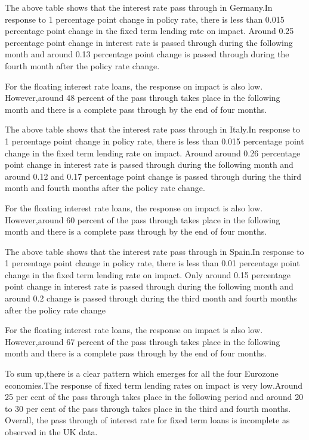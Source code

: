 \documentclass[12pt]{article}
\numberwithin{equation}{section}
\begin{document}
\begin{appendix}
The above table shows that the interest rate pass through in Germany.In response to 1 percentage point change in policy rate, there is less than 0.015 percentage point change in the fixed term lending rate on impact.  Around 0.25 percentage point change in interest rate is passed through during the following month and around 0.13 percentage point change is passed through during the fourth month after the policy rate change.

For the floating interest rate loans, the response on impact is also low. However,around 48 percent of the pass through takes place in the following month and there is a complete pass through by the end of four months.


The above table shows that the interest rate pass through in Italy.In response to 1 percentage point change in policy rate, there is less than 0.015 percentage point change in the fixed term lending rate on impact.  Around around 0.26 percentage point change in interest rate is passed through during the following month and around 0.12 and 0.17 percentage point change is passed through during the third month and fourth months after the policy rate change.

For the floating interest rate loans, the response on impact is also low. However,around 60 percent of the pass through takes place in the following month and there is a complete pass through by the end of four months.



The above table shows that the interest rate pass through in Spain.In response to 1 percentage point change in policy rate, there is less than 0.01 percentage point change in the fixed term lending rate on impact.  Only around 0.15 percentage point change in interest rate is passed through during the following month and around 0.2  change is passed through during the third month and fourth months after the policy rate change

For the floating interest rate loans, the response on impact is also low. However,around 67 percent of the pass through takes place in the following month and there is a complete pass through by the end of four months.

To sum up,there is a clear pattern which emerges for all the four Eurozone economies.The response of fixed term lending rates on impact is very low.Around 25 per cent of the pass through takes place in the following period and around 20 to 30 per cent of the pass through takes place in the third and fourth months. Overall, the pass through of interest rate for fixed term loans is incomplete as observed in the UK data.


\end{appendix}
\end{document}
